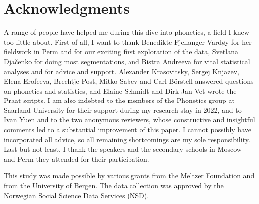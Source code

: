\documentclass[output=paper,colorlinks,citecolor=black]{langscibook}
\begin{document}
\section*{Acknowledgments}
A range of people have helped me during this dive into phonetics, a field I knew too little about. First of all, I want to thank Benedikte Fjellanger Vardøy for her fieldwork in Perm and for our exciting first exploration of the data, Svetlana Djačenko for doing most segmentations, and Bistra Andreeva for vital statistical analyses and for advice and support. Alexander Krasovitsky, Sergej Knjazev, Elena Erofeeva, Brechtje Post, Mitko Sabev and Carl Börstell answered questions on phonetics and statistics, and Elaine Schmidt and Dirk Jan Vet wrote the Praat scripts. I am also indebted to the members of the Phonetics group at Saarland University for their support during my research stay in 2022, and to Ivan Yuen and to the two anonymous reviewers, whose constructive and insightful comments led to a substantial improvement of this paper. I cannot possibly have incorporated all advice, so all remaining shortcomings are my sole responsibility. Last but not least, I thank the speakers and the secondary schools in Moscow and Perm they attended for their participation.

This study was made possible by various grants from the Meltzer Foundation and from the University of Bergen. The data collection was approved by the Norwegian Social Science Data Services (NSD).

\printbibliography[heading=subbibliography,notkeyword=this]
\end{document}
